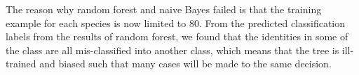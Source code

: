 \documentclass{article} %
\begin{document}
The reason why random forest and naive Bayes failed is that the training example for each species is now limited to 80. From the predicted classification labels from the results of random forest, we found that the identities in some of the class are all mis-classified into another class, which means that the tree is ill-trained and biased such that many cases will be made to the same decision. 





\end{document}
